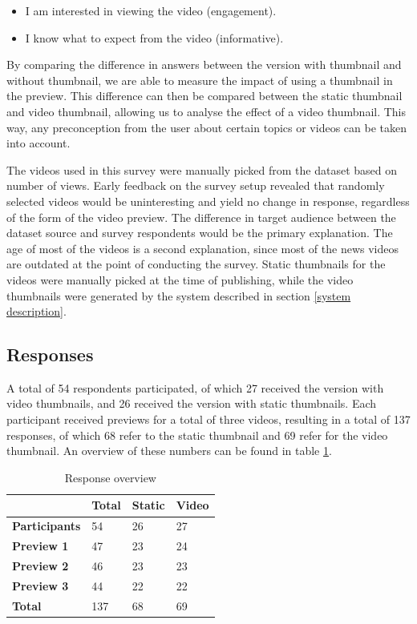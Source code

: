 \documentclass{../resources/sig-alternate-05-2015}
\begin{document}
\begin{itemize}
	\item I am interested in viewing the video (engagement).
	\item I know what to expect from the video (informative).
\end{itemize}

By comparing the difference in answers between the version with thumbnail and without thumbnail, we are able to measure the impact of using a thumbnail in the preview. This difference can then be compared between the static thumbnail and video thumbnail, allowing us to analyse the effect of a video thumbnail. This way, any preconception from the user about certain topics or videos can be taken into account.

The videos used in this survey were manually picked from the dataset based on number of views. Early feedback on the survey setup revealed that randomly selected videos would be uninteresting and yield no change in response, regardless of the form of the video preview. The difference in target audience between the dataset source and survey respondents would be the primary explanation. The age of most of the videos is a second explanation, since most of the news videos are outdated at the point of conducting the survey. Static thumbnails for the videos were manually picked at the time of publishing, while the video thumbnails were generated by the system described in section \ref{system description}.

\subsection{Responses}

A total of 54 respondents participated, of which 27 received the version with video thumbnails, and 26 received the version with static thumbnails. Each participant received previews for a total of three videos, resulting in a total of 137 responses, of which 68 refer to the static thumbnail and 69 refer for the video thumbnail. An overview of these numbers can be found in table \ref{number of responses table}.

\begin{table}[h]
\centering
\caption{Response overview}
\label{number of responses table}
\begin{tabular}{@{}llll@{}}
\textbf{}             & \textbf{Total} & \textbf{Static} & \textbf{Video} \\ \toprule
\textbf{Participants} & 54             & 26              & 27             \\ \midrule
\textbf{Preview 1}    & 47             & 23              & 24             \\
\textbf{Preview 2}    & 46             & 23              & 23             \\
\textbf{Preview 3}    & 44             & 22              & 22             \\ \bottomrule
\textbf{Total}        & 137            & 68              & 69             \\
\end{tabular}
\end{table}
\end{document}
